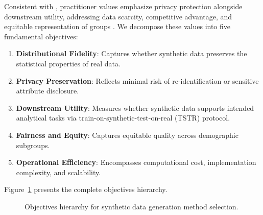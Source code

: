 \documentclass[12pt,a4paper]{article}
\begin{document}
Consistent with \citet{keeney1992value}, practitioner values emphasize privacy protection alongside downstream utility, addressing data scarcity, competitive advantage, and equitable representation of groups \citep{kapania2025examining,kaabachi2025privacy}. We decompose these values into five fundamental objectives:

\begin{enumerate}
    \item \textbf{Distributional Fidelity}: Captures whether synthetic data preserves the statistical properties of real data.
    
    \item \textbf{Privacy Preservation}: Reflects minimal risk of re-identification or sensitive attribute disclosure.
    
    \item \textbf{Downstream Utility}: Measures whether synthetic data supports intended analytical tasks via train-on-synthetic-test-on-real (TSTR) protocol.
    
    \item \textbf{Fairness and Equity}: Captures equitable quality across demographic subgroups.
    
    \item \textbf{Operational Efficiency}: Encompasses computational cost, implementation complexity, and scalability.
\end{enumerate}

Figure~\ref{fig:hierarchy} presents the complete objectives hierarchy.

\begin{figure}[htbp]
\centering
{}
\caption{Objectives hierarchy for synthetic data generation method selection.}
\label{fig:hierarchy}
\end{figure}
\end{document}
